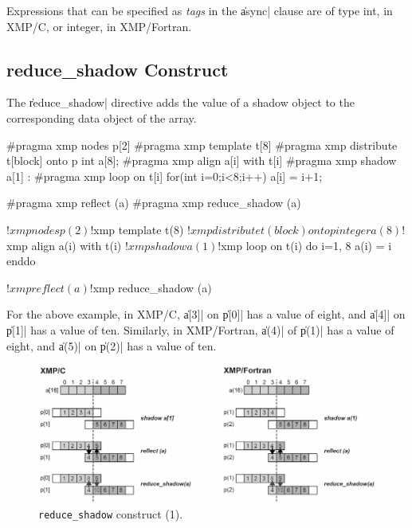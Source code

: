 \begin{mynote}
  Expressions that can be specified as {\it tags} in the \|async| clause are
  of type int, in XMP/C, or integer, in XMP/Fortran.
\end{mynote}


\subsection{{\bf reduce\_shadow} Construct}

The \|reduce_shadow| directive adds the value of a shadow object to the
corresponding data object of the array.

\begin{XCexample}
#pragma xmp nodes p[2]
#pragma xmp template t[8]
#pragma xmp distribute t[block] onto p
int a[8];
#pragma xmp align a[i] with t[i]
#pragma xmp shadow a[1]
 :
#pragma xmp loop on t[i]
  for(int i=0;i<8;i++)
    a[i] = i+1;

#pragma xmp reflect (a)
#pragma xmp reduce_shadow (a)
\end{XCexample}

\begin{XFexample}
!$xmp nodes p(2)
!$xmp template t(8)
!$xmp distribute t(block) onto p
  integer a(8)
!$xmp align a(i) with t(i)
!$xmp shadow a(1)

!$xmp loop on t(i)
  do i=1, 8
    a(i) = i
  enddo

!$xmp reflect (a)
!$xmp reduce_shadow (a)
\end{XFexample}


For the above example, in XMP/C, \|a[3]| on \|p[0]| has a value of eight,
and \|a[4]| on \|p[1]| has a value of ten. Similarly, in XMP/Fortran,
\|a(4)| of \|p(1)| has a value of eight, and \|a(5)| on \|p(2)| has a
value of ten.

\begin{figure}
  \centering
  \includegraphics[width=\textwidth]{figs/reduce_shadow.png}
  \caption{{\tt reduce\_shadow} construct (1).}
\end{figure}

